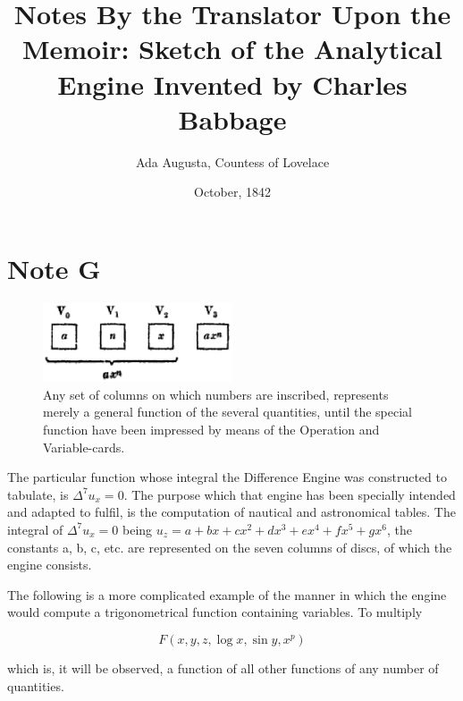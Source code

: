 \documentclass[11pt]{article}
\author{Ada Augusta, Countess of Lovelace}
\title{Notes By the Translator Upon the Memoir: Sketch of the Analytical Engine Invented
by Charles Babbage}
\date{October, 1842}
\begin{document}
\maketitle

\section{Note G}

\begin{figure}[htbp!]
\begin{center}
\includegraphics[width=0.5\textwidth]{var_diagram}
\end{center}
\caption{Any set of columns on which numbers are inscribed, represents merely a 
general function of the several quantities, until the special function have 
been impressed by means of the Operation and Variable-cards.}
\label{fig:var_diagram}
\end{figure}

The particular function whose integral the Difference Engine was constructed to
tabulate, is $\Delta^7u_x=0$. The purpose which that engine has been specially
intended and adapted to fulfil, is the computation of nautical and astronomical
tables. The integral of $\Delta^7u_x=0$ being   $u_z =
a+bx+cx^2+dx^3+ex^4+fx^5+gx^6$, the constants a, b, c, etc. are represented on the
seven columns of discs, of which the engine consists.

\pagebreak
The following is a more complicated example of the manner in which the
engine would compute a trigonometrical function containing variables.
To multiply

\begin{equation}
F(x, y, z, \log x, \sin y, x^p)
\end{equation}

which is, it will be observed, a function of all other functions of any number 
of quantities. 

\nocite{*}



\end{document}

